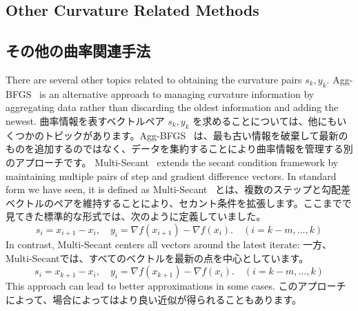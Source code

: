 \documentclass[0_main]{subfiles}
\begin{document}
\ifEn
    \subsection{Other Curvature Related Methods}
\else
    \subsection{その他の曲率関連手法}
\fi

\ifEn
    There are several other topics related to obtaining the curvature pairs $s_k, y_k$. Agg-BFGS~\citep{berahasLimitedmemoryBFGSDisplacement2022} is an alternative approach to managing curvature information by aggregating data rather than discarding the oldest information and adding the newest.
\else
    曲率情報を表すベクトルペア $s_k, y_k$ を求めることについては、他にもいくつかのトピックがあります。Agg-BFGS~\citep{berahasLimitedmemoryBFGSDisplacement2022} は、最も古い情報を破棄して最新のものを追加するのではなく、データを集約することにより曲率情報を管理する別のアプローチです。
\fi
\ifEn
    Multi-Secant~\citep{leeAdvancingMultiSecantQuasiNewton2025} extends the secant condition framework by maintaining multiple pairs of step and gradient difference vectors. In standard form we have seen, it is defined as
\else
    Multi-Secant~\citep{leeAdvancingMultiSecantQuasiNewton2025} とは、複数のステップと勾配差ベクトルのペアを維持することにより、セカント条件を拡張します。ここまでで見てきた標準的な形式では、次のように定義していました。
\fi
\begin{equation*}
    s_i = x_{i+1} - x_i, \quad y_i = \nabla f(x_{i+1}) - \nabla f(x_i). \quad (i = k-m, \ldots, k)
\end{equation*}
\ifEn
    In contrast, Multi-Secant centers all vectors around the latest iterate:
\else
    一方、Multi-Secantでは、すべてのベクトルを最新の点を中心としています。
\fi
\begin{equation*}
    s_i = x_{k+1} - x_i, \quad y_i = \nabla f(x_{k+1}) - \nabla f(x_i). \quad (i = k-m, \ldots, k)
\end{equation*}
\ifEn
    This approach can lead to better approximations in some cases.
\else
    このアプローチによって、場合によってはより良い近似が得られることもあります。
\fi

\ifSubfilesClassLoaded{
    
    
}{}
\end{document}
